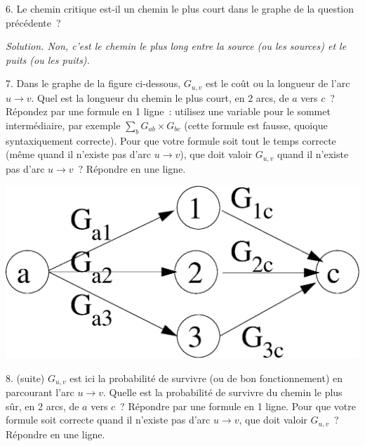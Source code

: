\documentclass[11pt]{article}
\begin{document}
\else
\fi

 
6. Le chemin critique est-il un chemin le plus court dans le graphe de la question précédente~?

\ifcorrige
{\it Solution. Non, c'est le chemin le plus long entre la source (ou les sources) et le puits (ou les puits).
}
\else
\fi

 
7. Dans le  graphe de la figure ci-dessous, $G_{u,v}$ est le coût ou la longueur de l'arc $u\rightarrow v$. Quel est la longueur du chemin le plus court, en 2 arcs, de $a$ vers $c$~? 
Répondez par une formule en 1 ligne~:
utilisez une variable pour le sommet intermédiaire, par exemple $\sum_b G_{ab}\times G_{bc}$ (cette formule est  fausse, quoique syntaxiquement correcte).
Pour que votre formule soit tout le temps correcte (même quand il n'existe pas d'arc $u\rightarrow v$), que doit valoir $G_{u,v}$ quand  il n'existe pas d'arc $u\rightarrow v$~?
Répondre en une ligne.

\begin{center}
\includegraphics[width=0.5\linewidth]{graphe.eps}
\end{center}
\else\fi

 
8. (suite)  $G_{u,v}$ est ici  la probabilité de survivre
(ou de bon fonctionnement) en parcourant l'arc
$u\rightarrow v$. Quelle est la probabilité de survivre du  chemin le plus sûr, en 2 arcs,
de $a$ vers $c$~?  Répondre par une formule en 1 ligne.
Pour que votre formule soit correcte quand il n'existe pas d'arc $u\rightarrow v$, que doit valoir $G_{u,v}$~?
Répondre en une ligne.
 
\end{document}
